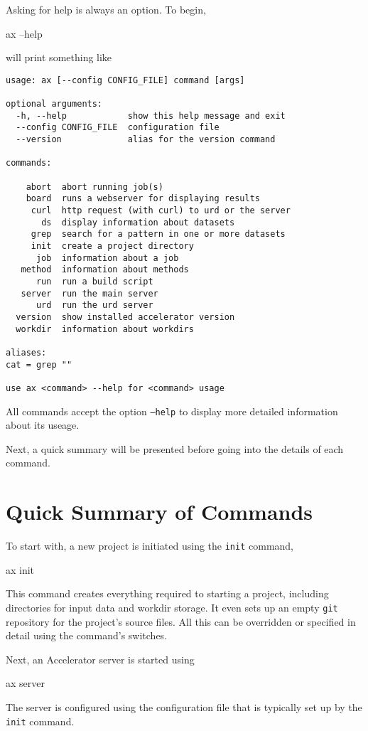 Asking for help is always an option.  To begin,
\begin{shell}
ax --help
\end{shell}
will print something like
\begin{snugshade}
\begin{verbatim}
usage: ax [--config CONFIG_FILE] command [args]

optional arguments:
  -h, --help            show this help message and exit
  --config CONFIG_FILE  configuration file
  --version             alias for the version command

commands:

    abort  abort running job(s)
    board  runs a webserver for displaying results
     curl  http request (with curl) to urd or the server
       ds  display information about datasets
     grep  search for a pattern in one or more datasets
     init  create a project directory
      job  information about a job
   method  information about methods
      run  run a build script
   server  run the main server
      urd  run the urd server
  version  show installed accelerator version
  workdir  information about workdirs

aliases:
cat = grep ""

use ax <command> --help for <command> usage
\end{verbatim}
\end{snugshade}
\noindent All commands accept the option \texttt{--help} to display
more detailed information about its useage.

Next, a quick summary will be presented before going into
the details of each command.


\section{Quick Summary of Commands}
To start with, a new project is initiated using the \texttt{init}
command,
\begin{shell}
ax init
\end{shell}
This command creates everything required to starting a project,
including directories for input data and workdir storage.  It even
sets up an empty \texttt{git} repository for the project's source
files.  All this can be overridden or specified in detail using the
command's switches.

Next, an Accelerator server is started using
\begin{shell}
ax server
\end{shell}
The server is configured using the configuration file that is
typically set up by the \texttt{init} command.

